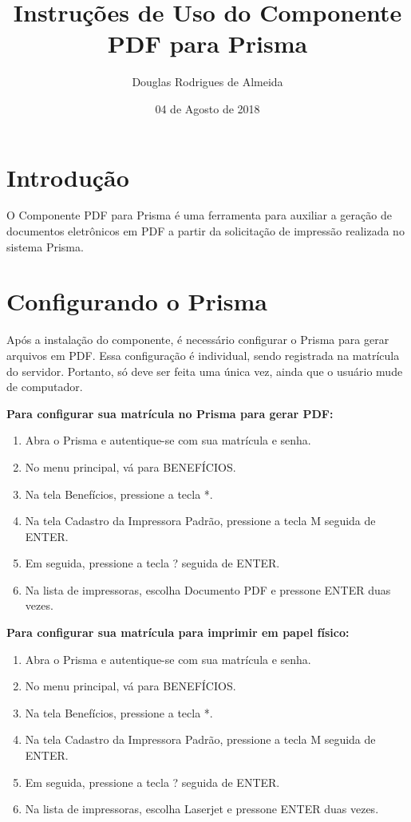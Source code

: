 \documentclass[12pt,a4paper]{article}
\title{Instruções de Uso do Componente PDF para Prisma}
\author{Douglas Rodrigues de Almeida}
\date{04 de Agosto de 2018}
\begin{document}
\maketitle

\section{Introdução}
O Componente PDF para Prisma é uma ferramenta para auxiliar a geração de documentos eletrônicos em PDF a partir da solicitação de impressão realizada no sistema Prisma.

\section{Configurando o Prisma}
Após a instalação do componente, é necessário configurar o Prisma para gerar arquivos em PDF. Essa configuração é individual, sendo registrada na matrícula do servidor. Portanto, só deve ser feita uma única vez, ainda que o usuário mude de computador.

\textbf{Para configurar sua matrícula no Prisma para gerar PDF:}

\begin{enumerate}
  \item Abra o Prisma e autentique-se com sua matrícula e senha.
  \item No menu principal, vá para BENEFÍCIOS.
  \item Na tela Benefícios, pressione a tecla *.
  \item Na tela Cadastro da Impressora Padrão, pressione a tecla M seguida de ENTER.
  \item Em seguida, pressione a tecla ? seguida de ENTER.
  \item Na lista de impressoras, escolha Documento PDF e pressone ENTER duas vezes.
\end{enumerate}

\textbf{Para configurar sua matrícula para imprimir em papel físico:}

\begin{enumerate}
  \item Abra o Prisma e autentique-se com sua matrícula e senha.
  \item No menu principal, vá para BENEFÍCIOS.
  \item Na tela Benefícios, pressione a tecla *.
  \item Na tela Cadastro da Impressora Padrão, pressione a tecla M seguida de ENTER.
  \item Em seguida, pressione a tecla ? seguida de ENTER.
  \item Na lista de impressoras, escolha Laserjet e pressone ENTER duas vezes.
\end{enumerate}
\end{document}
